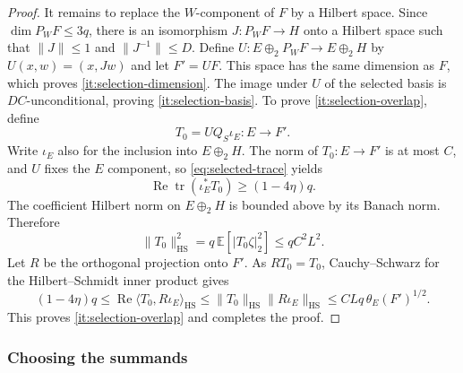 \documentclass[11pt,a4paper,reqno]{amsart}
\theoremstyle{definition}
\newcommand{\norm}[1]{\lVert #1\rVert}
\DeclareMathOperator{\tr}{tr}
\numberwithin{equation}{section}
\begin{document}
\begin{proof}
It remains to replace the $W$-component of $F$ by a Hilbert space. Since $\dim P_WF\leq3q$, there is an isomorphism $J\colon P_WF\to H$ onto a Hilbert space such that $\norm J\leq1$ and $\norm{J^{-1}}\leq D$. Define $U\colon E\oplus_2P_WF\to E\oplus_2H$ by $U(x,w)=(x,Jw)$ and let $F'=UF$. This space has the same dimension as $F$, which proves \ref{it:selection-dimension}. The image under $U$ of the selected basis is $DC$-unconditional, proving \ref{it:selection-basis}. To prove \ref{it:selection-overlap}, define
\begin{equation*}
    T_0=UQ_S\iota_E\colon E\longrightarrow F'.
\end{equation*}
Write $\iota_E$ also for the inclusion into $E\oplus_2H$. The norm of $T_0\colon E\to F'$ is at most $C$, and $U$ fixes the $E$ component, so \eqref{eq:selected-trace} yields
\begin{equation*}
    \operatorname{Re}\tr(\iota_E^*T_0)\geq(1-4\eta)q.
\end{equation*}
The coefficient Hilbert norm on $E\oplus_2H$ is bounded above by its Banach norm. Therefore
\begin{equation*}
    \norm{T_0}_{\mathrm{HS}}^2
       =q\,\mathbb E[|T_0\zeta|_2^2]\leq qC^2L^2.
\end{equation*}
Let $R$ be the orthogonal projection onto $F'$. As $RT_0=T_0$, Cauchy--Schwarz for the Hilbert--Schmidt inner product gives
\begin{equation*}
    (1-4\eta)q
       \leq\operatorname{Re}\langle T_0,R\iota_E\rangle_{\mathrm{HS}}
       \leq\norm{T_0}_{\mathrm{HS}}\norm{R\iota_E}_{\mathrm{HS}}
       \leq CLq\,\theta_E(F')^{1/2}.
\end{equation*}
This proves \ref{it:selection-overlap} and completes the proof.
\end{proof}

\subsubsection{Choosing the summands}\label{sec:choosing-summands}
\end{document}
